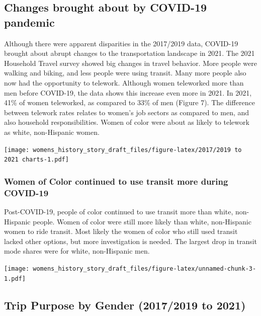 \documentclass[
  12pt,
]{article}
\begin{document}
\hypertarget{changes-brought-about-by-covid-19-pandemic}{%
\subsection{Changes brought about by COVID-19
pandemic}\label{changes-brought-about-by-covid-19-pandemic}}

\begin{flushleft}
Although there were apparent disparities in the 2017/2019 data, COVID-19 brought about abrupt changes to the transportation landscape in 2021. The 2021 Household Travel survey showed big changes in travel behavior. More people were walking and biking, and less people were using transit. Many more people also now had the opportunity to telework. Although women teleworked more than men before COVID-19, the data shows this increase even more in 2021. In 2021, 41\% of women teleworked, as compared to 33\% of men (Figure 7). The difference between telework rates relates to women's job sectors as compared to men, and also household responsibilities. Women of color were about as likely to telework as white, non-Hispanic women.
\end{flushleft}

\texttt{[image: womens\_history\_story\_draft\_files/figure-latex/2017/2019 to 2021 charts-1.pdf]}

\hypertarget{women-of-color-continued-to-use-transit-more-during-covid-19}{%
\subsubsection{Women of Color continued to use transit more during
COVID-19}\label{women-of-color-continued-to-use-transit-more-during-covid-19}}

Post-COVID-19, people of color continued to use transit more than white,
non-Hispanic people. Women of color were still more likely than white,
non-Hispanic women to ride transit. Most likely the women of color who
still used transit lacked other options, but more investigation is
needed. The largest drop in transit mode shares were for white,
non-Hispanic men.

\texttt{[image: womens\_history\_story\_draft\_files/figure-latex/unnamed-chunk-3-1.pdf]}

\hypertarget{trip-purpose-by-gender-20172019-to-2021}{%
\subsection{Trip Purpose by Gender (2017/2019 to
2021)}\label{trip-purpose-by-gender-20172019-to-2021}}
\end{document}
